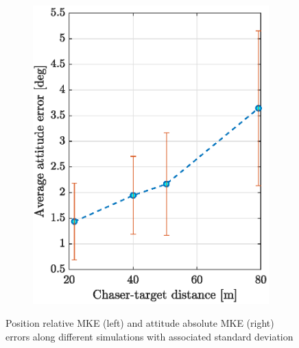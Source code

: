 \begin{figure}[!h]
\begin{subfigure}{0.48\linewidth}
        \includegraphics[width=\linewidth]{Images/DistAtt.eps}
    \end{subfigure}
    \caption[Average position and attitude errors at different distances]{Position relative MKE (left) and attitude absolute MKE (right) errors along different simulations with associated standard deviation}
    \label{fig:disterrors}
\end{figure}

